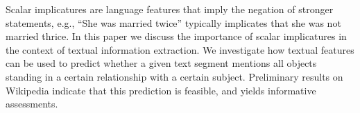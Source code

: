 Scalar implicatures are language features that imply the negation of stronger statements, e.g., ``She was married twice'' typically implicates that she was not married thrice.
In this paper we discuss the importance of scalar implicatures in the context of textual information extraction. We investigate how textual features can be used to predict whether a given text segment mentions all objects standing in a certain relationship with a certain subject. Preliminary results on Wikipedia indicate that this prediction is feasible, and yields informative assessments.